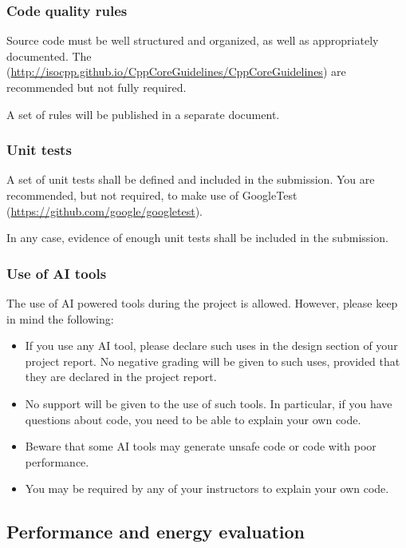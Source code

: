 \subsubsection{Code quality rules}

Source code must be well structured and organized, 
as well as appropriately documented.
The 
(\url{http://isocpp.github.io/CppCoreGuidelines/CppCoreGuidelines})
are recommended but not fully required.

A set of rules will be published in a separate document.

\subsubsection{Unit tests}

A set of unit tests shall be defined and included in the submission.
You are recommended, but not required, to make use of GoogleTest
(\url{https://github.com/google/googletest}).

In any case, evidence of enough unit tests shall be included in the
submission.

\subsubsection{Use of AI tools}

The use of AI powered tools during the project is allowed. However, please
keep in mind the following:

\begin{itemize}

\item If you use any AI tool, please declare such uses in the design section
of your project report. No negative grading will be given to such uses, provided
that they are declared in the project report.

\item No support will be given to the use of such tools. In particular, if you
have questions about code, you need to be able to explain your own code.

\item Beware that some AI tools may generate unsafe code or code with poor 
performance.

\item You may be required by any of your instructors to explain your own code.


\end{itemize}

\subsection{Performance and energy evaluation}


